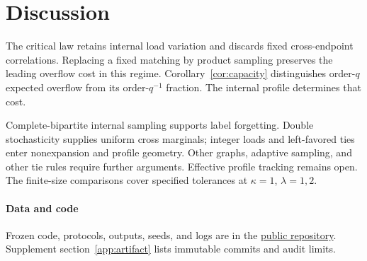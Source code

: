 \section{Discussion}
The critical law retains internal load variation and discards fixed
cross-endpoint correlations. Replacing a fixed matching by product sampling
preserves the leading overflow cost in this regime.
Corollary~\ref{cor:capacity} distinguishes order-$q$ expected overflow from
its order-$q^{-1}$ fraction. The internal profile determines that cost.

Complete-bipartite internal sampling supports label forgetting.
Double stochasticity supplies uniform cross marginals; integer loads and
left-favored ties enter nonexpansion and profile geometry.
Other graphs, adaptive sampling, and other tie rules require further arguments.
Effective profile tracking remains open. The finite-size comparisons cover
specified tolerances at $\kappa=1$, $\lambda=1,2$.

\paragraph{Data and code}
Frozen code, protocols, outputs, seeds, and logs are in the
\href{https://github.com/19991111/huaweipro-tpht-linux}{public repository}.
Supplement section~\ref*{app:artifact} lists immutable commits and audit limits.

